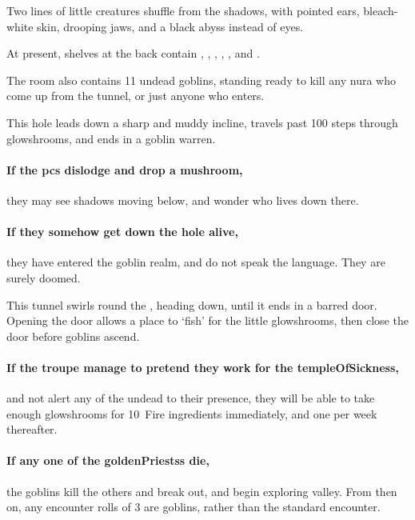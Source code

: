 \begin{multicols}{2}
\begin{boxtext}
  Two lines of little creatures shuffle from the shadows, with pointed ears, bleach-white skin, drooping jaws, and a black abyss instead of eyes.
\end{boxtext}

At present, shelves at the back contain \lootMedium, \lootJewellery, \lootJewellery, \lootJewellery, \lootJewellery, and \lootBig.

The room also contains 11 undead goblins, standing ready to kill any nura who come up from the tunnel, or just anyone who enters.

\undeadgoblin

\undeadhobgoblin


This hole leads down a sharp and muddy incline, travels past 100 \glspl{step} through \glspl{glowshroom}, and ends in a goblin warren.

\paragraph{If the \glspl{pc} dislodge and drop a mushroom,}
they may see shadows moving below, and wonder who lives down there.

\paragraph{If they somehow get down the hole alive,}
they have entered the goblin realm, and do not speak the language.
They are surely doomed.


\begin{exampletext}
  This tunnel swirls round the , heading down, until it ends in a barred door.
  Opening the door allows a place to `fish' for the little \glspl{glowshroom}, then close the door before goblins ascend.
\end{exampletext}


\bigLine

\paragraph{If the troupe manage to pretend they work for the \gls{templeOfSickness},}
and not alert any of the undead to their presence, they will be able to take enough \glspl{glowshroom} for 10~Fire \glspl{ingredient} immediately, and one per week thereafter.

\paragraph{If any one of the \glspl{goldenPriests} die,}
the goblins kill the others and break out, and begin exploring \gls{valley}.
From then on, any encounter rolls of 3 are goblins, rather than the standard encounter.%

\end{multicols}
